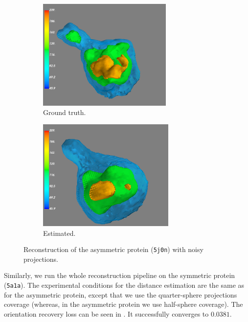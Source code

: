 \begin{figure}[ht!]
    \centering
    \begin{subfigure}[b]{0.45\textwidth}
        \includegraphics[height=5.5cm]{images/5j0n_reconstruction_GT_noise16.png}
        \caption{Ground truth.}
    \end{subfigure}
    \hfill
    \begin{subfigure}[b]{0.5\textwidth}
    \centering
        \includegraphics[height=5.5cm]{images/5j0n_reconstruction_noise16.png}
        \caption{Estimated.}
    \end{subfigure}
    \caption{
        Reconstruction of the asymmetric protein (\texttt{5j0n}) with noisy projections.
    }\label{fig:5j0n-reconstruction-noise16}
\end{figure}




Similarly, we run the whole reconstruction pipeline on the symmetric protein (\texttt{5a1a}).
The experimental conditions for the distance estimation are the same as for the asymmetric protein, except that we use the quarter-sphere projections coverage (whereas, in the asymmetric protein we use half-sphere coverage).
The orientation recovery loss can be seen in . It successfully converges to $0.0381$.


